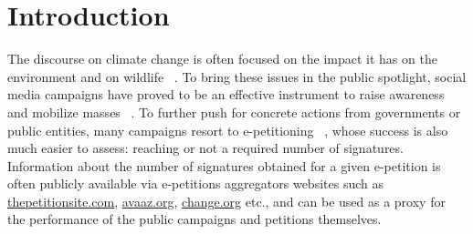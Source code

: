 \section{Introduction}
\label{sec:intro}

%
%

The discourse on climate change is often focused on the impact it has on the environment and on  wildlife~\citeauthor{solomon2009irreversible} .
To bring these issues in the public spotlight, social media campaigns have proved to be an effective instrument to raise awareness and mobilize masses~\citeauthor{Pearce2014} .
To further push for concrete actions from governments or public entities, many campaigns resort to e-petitioning~\citeauthor{mosca2009petitioning} , whose success is also much easier to assess: reaching or not a required number of signatures.
Information about the number of signatures obtained for a given e-petition is often publicly available via e-petitions aggregators websites such as \url{thepetitionsite.com}, \url{avaaz.org}, \url{change.org} etc., and can be used as a proxy for the performance of the public campaigns and petitions themselves.

%

